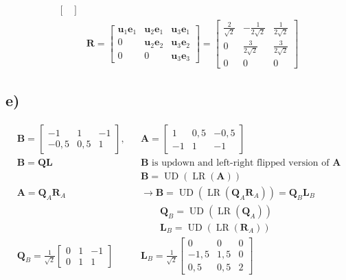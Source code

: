 \documentclass[fleqn]{article}
\DeclareMathOperator{\UD}{UD}
\DeclareMathOperator{\LR}{LR}
\begin{document}
\begin{align*}
\begin{bmatrix}
	\end{bmatrix}& \\
	&\mathbf{R}=
	\begin{bmatrix}
	\mathbf{u}_{1}\mathbf{e}_{1} & \mathbf{u}_{2}\mathbf{e}_{1} & \mathbf{u}_{3}\mathbf{e}_{1} \\
	0 & \mathbf{u}_{2}\mathbf{e}_{2} & \mathbf{u}_{3}\mathbf{e}_{2} \\
	0 & 0 & \mathbf{u}_{3}\mathbf{e}_{3}
	\end{bmatrix}=
	\begin{bmatrix}
	\frac{2}{\sqrt{2}} & -\frac{1}{2\sqrt{2}} & \frac{1}{2\sqrt{2}} \\
	0 & \frac{3}{2\sqrt{2}} & \frac{3}{2\sqrt{2}} \\
	0 & 0 & 0
	\end{bmatrix}
\end{align*}

\subsection*{e)}
\begin{align*}
	&\mathbf{B}=
	\begin{bmatrix}
	-1 & 1 & -1 \\
	-0,5 & 0,5 & 1
	\end{bmatrix},&&\mathbf{A}=
	\begin{bmatrix}
	1 & 0,5 & -0,5 \\
	-1 & 1 & -1
	\end{bmatrix}& \\
	&\mathbf{B=QL}&&\text{$\mathbf{B}$ is updown and left-right flipped version of $\mathbf{A}$}& \\
	&& &\mathbf{B}=\UD\left(\LR\left(\mathbf{A}\right)\right)& \\
	&\mathbf{A=Q}_{A}\mathbf{R}_{A}& &\rightarrow\mathbf{B}=\UD\left(\LR\left(\mathbf{Q}_{A}\mathbf{R}_{A}\right)\right)=\mathbf{Q}_{B}\mathbf{L}_{B}& \\
	&& &\qquad\mathbf{Q}_{B}=\UD\left(\LR\left(\mathbf{Q}_{A}\right)\right)& \\
	&& &\qquad\mathbf{L}_{B}=\UD\left(\LR\left(\mathbf{R}_{A}\right)\right)& \\
	&\mathbf{Q}_{B}=\frac{1}{\sqrt{2}}
	\begin{bmatrix}
	0 & 1 & -1 \\
	0 & 1 & 1
	\end{bmatrix}&
	&\mathbf{L}_{B}=\frac{1}{\sqrt{2}}
	\begin{bmatrix}
	0 & 0 & 0 \\
	-1,5 & 1,5 & 0 \\
	0,5 & 0,5 & 2
	\end{bmatrix}&
\end{align*}
\end{document}
